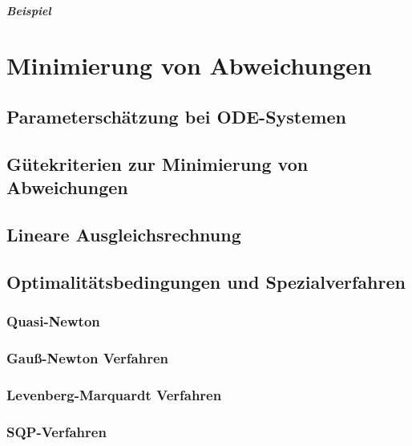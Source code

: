 		\paragraph{Beispiel} %

\chapter{Minimierung von Abweichungen} %

	\section{Parameterschätzung bei ODE-Systemen} %

	\section{Gütekriterien zur Minimierung von Abweichungen} %

	\section{Lineare Ausgleichsrechnung} %

	\section{Optimalitätsbedingungen und Spezialverfahren} %

		\subsection{Quasi-Newton} %

		\subsection{Gauß-Newton Verfahren} %

		\subsection{Levenberg-Marquardt Verfahren} %

		\subsection{SQP-Verfahren} %

